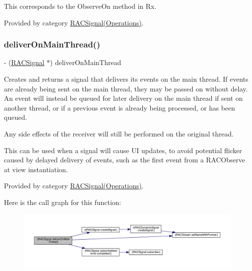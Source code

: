 This corresponds to the {\ttfamily Observe\+On} method in Rx. 

Provided by category \mbox{\hyperlink{category_r_a_c_signal_07_operations_08_a69e4dc1c476da42ed829caed84fbd258}{R\+A\+C\+Signal(\+Operations)}}.

\mbox{\label{interface_r_a_c_signal_a0c7042ce0eb6c729bc38421295296db1}} 
\subsubsection{\texorpdfstring{deliver\+On\+Main\+Thread()}{deliverOnMainThread()}\hspace{0.1cm}{\footnotesize\ttfamily [1/3]}}
{\footnotesize\ttfamily -\/ (\mbox{\hyperlink{interface_r_a_c_signal}{R\+A\+C\+Signal}} $\ast$) deliver\+On\+Main\+Thread \begin{DoxyParamCaption}{ }\end{DoxyParamCaption}}

Creates and returns a signal that delivers its events on the main thread. If events are already being sent on the main thread, they may be passed on without delay. An event will instead be queued for later delivery on the main thread if sent on another thread, or if a previous event is already being processed, or has been queued.

Any side effects of the receiver will still be performed on the original thread.

This can be used when a signal will cause UI updates, to avoid potential flicker caused by delayed delivery of events, such as the first event from a R\+A\+C\+Observe at view instantiation. 

Provided by category \mbox{\hyperlink{category_r_a_c_signal_07_operations_08_a0c7042ce0eb6c729bc38421295296db1}{R\+A\+C\+Signal(\+Operations)}}.

Here is the call graph for this function\+:\nopagebreak
\begin{figure}[H]
\begin{center}
\leavevmode
\includegraphics[width=350pt]{interface_r_a_c_signal_a0c7042ce0eb6c729bc38421295296db1_cgraph}
\end{center}
\end{figure}
\mbox{\label{interface_r_a_c_signal_a0c7042ce0eb6c729bc38421295296db1}} 
